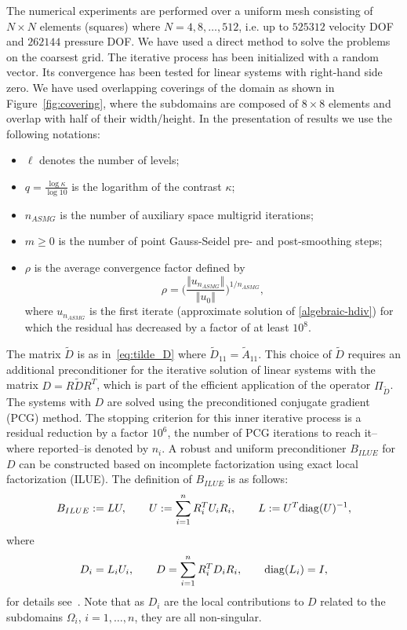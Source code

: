 \documentclass[11pt]{amsart}
\numberwithin{equation}{section}
\theoremstyle{definition}\newtheorem{example}{Example}[section]
\begin{document}
The numerical experiments are performed over a uniform mesh consisting of $N{\times}N$ elements (squares) 
where $N=4,8,\ldots,512$, i.e. up to $525 312$ velocity DOF and $262 144$ pressure DOF.
We have used a direct method to solve the problems on the coarsest grid.
The iterative process has been initialized with a random vector.
Its convergence has been tested for linear systems with right-hand side zero.
We have used overlapping coverings of the domain as shown in Figure~\ref{fig:covering}, 
where the subdomains are composed of $8\times 8$ elements and overlap with half of their
width/height. 
In the presentation of results we use the following notations:
\begin{itemize}
\item $\ell$ denotes the number of levels;
\item $q=\frac{\log \kappa}{\log 10}$ is the logarithm of the contrast $\kappa$;
\item $n_{ASMG}$ is the number of auxiliary space multigrid iterations;
\item $m\geq 0$ is the number of 
point Gauss-Seidel pre- and post-smoothing steps;
\item $\rho$ is the average convergence factor defined by
\begin{equation}\label{eq:average_factor}
\rho=\Bigg(\frac{\Vert u_{n_{ASMG}} \Vert}{\Vert u_0 \Vert}\Bigg)^{1/n_{ASMG}},
\end{equation}
where 
$u_{n_{ASMG}}$ is the
first iterate (approximate solution of \eqref{algebraic-hdiv}) for which the residual
has decreased by a factor of at least $10^8$.
\end{itemize}
The matrix $\widetilde{D}$ is as in~\eqref{eq:tilde_D} where 
$\widetilde{D}_{11}=\widetilde{A}_{11}$. This choice of $\widetilde{D}$ requires an
additional preconditioner for the iterative solution of linear systems with the matrix
$D=R \widetilde{D} R^T$, which is part of the efficient application of the operator
$\Pi_{\widetilde{D}}$. The systems with $D$ are solved using the preconditioned conjugate
gradient (PCG) method. The stopping criterion for this inner iterative process is a
residual reduction by a factor $10^6$, the number of PCG iterations to reach it--where
reported--is denoted by $n_i$. A robust and uniform preconditioner $B_{ILUE}$ for $D$
can be constructed based on incomplete factorization using exact local factorization (ILUE).
The definition of $B_{ILUE}$ is as follows:
$$
B_{ILUE}:=LU,\qquad U:=\sum_{i=1}^n R_i^T U_i R_i,\qquad L:=U^T {\rm diag}(U)^{-1}, 
$$ 
where 
$$
D_i=L_i U_i,\qquad D=\sum_{i=1}^n R_i^T D_i R_i, \qquad {\rm diag}(L_i)=I,
$$
for details see~\cite{Kraus2009robust}.
Note that as $D_i$ are the local contributions to $D$ related to the subdomains
$\Omega_i$, $i=1,\dots,n$, they are all non-singular.
\end{document}
